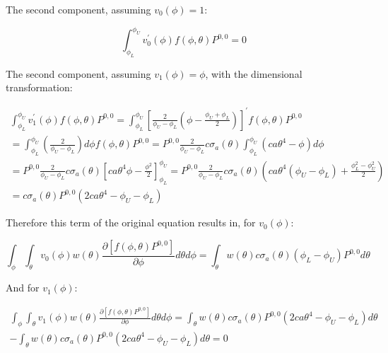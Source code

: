\documentclass[12pt,a4paper,pagesize=pdftex]{scrartcl}
\begin{document}
The second component, assuming \(v_0\left(\phi\right) = 1\):

\begin{equation*}
    \int_{\phi_L}^{\phi_U} v_0^\prime\left(\phi\right) f\left(\phi, \theta\right) P^{0,0} = 0
\end{equation*}

The second component, assuming \(v_1\left(\phi\right) = \phi\), with the dimensional transformation:

\begin{multline*}
    \int_{\phi_L}^{\phi_U} v_1^\prime\left(\phi\right) f\left(\phi, \theta\right) P^{0,0} = \int_{\phi_L}^{\phi_U} \left[\frac{2}{\phi_U - \phi_L} \left(\phi - \frac{\phi_U + \phi_L}{2}\right)\right]^\prime f\left(\phi,\theta\right) P^{0,0} \\
    = \int_{\phi_L}^{\phi_U} \left(\frac{2}{\phi_U - \phi_L}\right) d \phi f \left(\phi, \theta\right) P^{0,0} = P^{0,0} \frac{2}{\phi_U - \phi_L} c \sigma_a\left(\theta\right) \int_{\phi_L}^{\phi_U} \left(c a \theta^4 - \phi\right) d \phi \\
    = P^{0,0} \frac{2}{\phi_U - \phi_L} c \sigma_a\left(\theta\right) \left[c a \theta^4 \phi - \frac{\phi^2}{2}\right]_{\phi_L}^{\phi_U} = P^{0,0} \frac{2}{\phi_U - \phi_L} c \sigma_a\left(\theta\right) \left(c a \theta^4 \left(\phi_U - \phi_L\right) + \frac{\phi_L^2 - \phi_U^2}{2}\right) \\
    = c \sigma_a\left(\theta\right) P^{0,0} \left(2 c a \theta^4 - \phi_U - \phi_L\right)
\end{multline*}

Therefore this term of the original equation results in, for \(v_0\left(\phi\right)\):

\begin{equation*}
    \int_\phi \int_\theta v_0\left(\phi\right) w\left(\theta\right) \frac{\partial \left[f \left(\phi, \theta\right) P^{0,0}\right]}{\partial \phi} d \theta d \phi = \int_\theta w\left(\theta\right) c \sigma_a\left(\theta\right) \left(\phi_L - \phi_U\right) P^{0,0} d\theta
\end{equation*}

And for \(v_1\left(\phi\right)\):

\begin{multline*}
    \int_\phi \int_\theta v_1\left(\phi\right) w\left(\theta\right) \frac{\partial \left[f \left(\phi, \theta\right) P^{0,0}\right]}{\partial \phi} d \theta d \phi = \int_\theta w\left(\theta\right) c \sigma_a\left(\theta\right) P^{0,0} \left(2 c a \theta^4 - \phi_U - \phi_L\right) d\theta \\
    - \int_\theta w\left(\theta\right) c \sigma_a\left(\theta\right) P^{0,0} \left(2 c a \theta^4 - \phi_U - \phi_L\right) d\theta = 0
\end{multline*}
\end{document}
